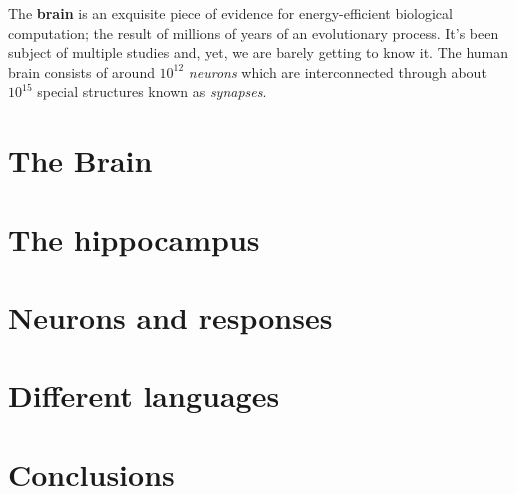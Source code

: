 The \textbf{brain} is an exquisite piece of evidence for energy-efficient biological computation; the result of millions of years of an evolutionary process. It's been subject of multiple studies and, yet, we are barely getting to know it. The human brain consists of around $10^{12}$ \emph{neurons} which are interconnected through about $10^{15}$ special structures known as \emph{synapses}.
\section{The Brain}
\label{sec:brain:brain}

\section{The hippocampus}
\label{sec:brain:hippo}

\section{Neurons and responses}
\label{sec:brain:neurons}


\section{Different languages}
\label{sec:brain:codes}

\section{Conclusions}
